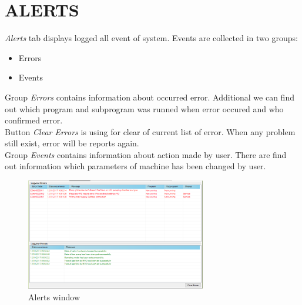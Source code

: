 \section {ALERTS}

\textit{Alerts} tab displays logged all event of system. Events are collected in two groups:
\begin{itemize}
	\item Errors
	\item Events
\end{itemize}

Group \textit{Errors} contains information about occurred error. Additional we can find out which program and subprogram was runned when error occured and who confirmed error. \\

Button \textit{Clear Errors} is using for clear of current list of error. When any problem still exist, error will be reports again.\\

Group \textit{Events}  contains information about action made by user. There are find out information which parameters of machine has been changed by user.

	\begin{figure}[!h] 
	\centering \includegraphics[width=0.7\textwidth]{Graphic/Alerts/AlertsWindow.png}	
	\caption{Alerts window}
	\label{alerts_window}
	\end{figure}
	\FloatBarrier
